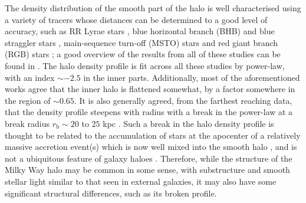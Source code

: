The density distribution of the smooth part of the halo is well characterised using a variety of tracers whose distances can be determined to a good level of accuracy, such as RR Lyrae stars 
\citep[e.g.][]{2009MNRAS.398.1757W,2010ApJ...708..717S,2013AJ....146...21S,2014ApJ...788..105F}, blue horizontal branch (BHB) and blue straggler stars \citep[e.g.][]{2011MNRAS.416.2903D}, main-sequence turn-off (MSTO) stars \citep[e.g.][]{2011ApJ...731....4S} and red giant branch (RGB) stars \citep[e.g.][]{2015ApJ...809..144X}; a good overview of the results from all of these studies can be found in \citet{2016ARA&A..54..529B}. The halo density profile is fit across all these studies by power-law, with an index $\sim-2.5$ in the inner parts. Additionally, most of the aforementioned works agree that the inner halo is flattened somewhat, by a factor somewhere in the region of $\sim 0.65$. It is also generally agreed, from the farthest reaching data, that the density profile steepens with radius with a break in the power-law at a break radius $r_{\mathrm{b}}\sim 20$ to $25$ kpc \citep[e.g.][]{2009MNRAS.398.1757W,2011ApJ...731....4S,2011MNRAS.416.2903D}. Such a break in the halo density profile is thought to be related to the accumulation of stars at the apocenter of a relatively massive accretion event(s) which is now well mixed into the smooth halo \citep{2013ApJ...763..113D}, and is not a ubiquitous feature of galaxy haloes \citep[a good example being the lack of such a break in M31, e.g.][]{2011ApJ...739...20C}. Therefore, while the structure of the Milky Way halo may be common in some sense, with substructure and smooth stellar light similar to that seen in external galaxies, it may also have some significant structural differences, such as its broken profile. 

